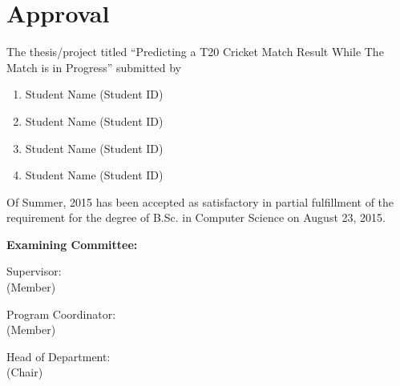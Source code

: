 \section*{Approval}

The thesis/project titled “Predicting a T20 Cricket Match Result While The Match is in Progress” submitted by 
\begin{enumerate}
  \item Student Name (Student ID)
  \item Student Name (Student ID)
  \item Student Name (Student ID) 
  \item Student Name (Student ID)
\end{enumerate}

Of Summer, 2015 has been accepted as satisfactory in partial fulfillment of the requirement for the degree of B.Sc. in Computer Science on August 23, 2015. 

\vspace{0.5cm}
\textbf{Examining Committee:}

\vspace{1cm}

Supervisor:\\
(Member)
\begin{center}
    \hspace{7cm}  \hspace{1cm} 
\end{center}

Program Coordinator:\\
(Member)
\begin{center}
    \hspace{7cm}  \hspace{1cm} 
\end{center}

Head of Department:\\
(Chair)
\begin{center}
    \hspace{7cm}  \hspace{1cm} 
\end{center}

\pagebreak